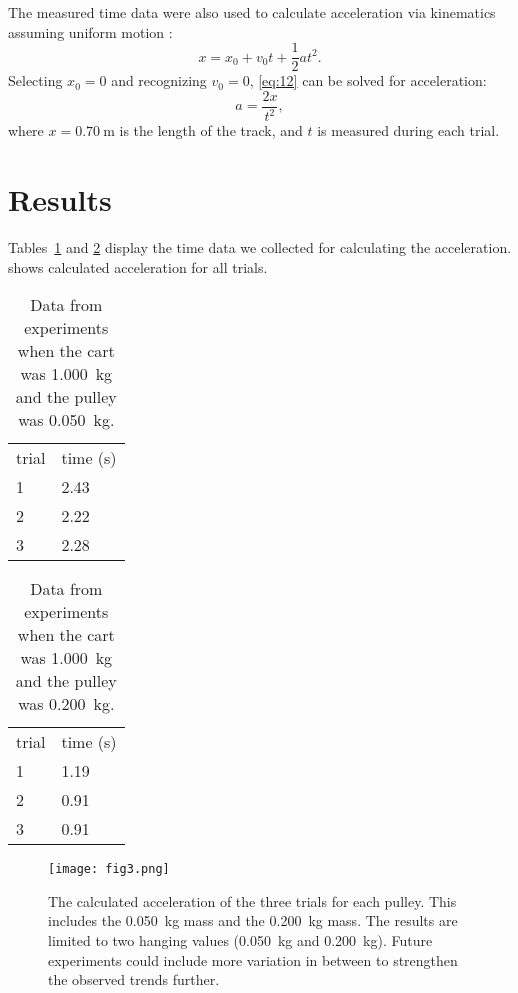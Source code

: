 ﻿\documentclass[reprint,amsmath,amssymb.aps]{revtex4-2}
\begin{document}
The measured time data were also used to calculate acceleration via kinematics assuming uniform motion \cite{tipler}:
\begin{equation}
x = x_0 + v_0 t + \dfrac{1}{2} a t^2.
\label{eq:12}
\end{equation}
Selecting $x_0=0$ and recognizing $v_0=0$, \cref{eq:12} can be solved for acceleration:
\begin{equation}
a = \dfrac{2 x}{t^2},
\label{eq:13}
\end{equation}
where $x=\qty{0.70}{\meter}$ is the length of the track, and $t$ is measured during each trial. 







\section{Results}
Tables~\ref{tab:1} and \ref{tab:2} display the time data we collected for calculating the acceleration.  shows calculated acceleration for all trials. 

\begin{table}
\caption{Data from experiments when the cart was \qty{1.000}{\kilo\gram} and the pulley was \qty{0.050}{\kilo\gram}.} 
\label{tab:1}
\begin{center}
\begin{tabular}{ll}
trial & time (\unit{\second}) \\
1 & 2.43\\
2 & 2.22\\
3 & 2.28
\end{tabular}
\end{center}
\end{table}
	
\begin{table}
\caption{Data from experiments when the cart was \qty{1.000}{\kilo\gram} and the pulley was \qty{0.200}{\kilo\gram}.}
\label{tab:2}
\begin{center}
\begin{tabular}{ll}
trial & time (\unit{\second}) \\
1 & 1.19\\
2 & 0.91\\
3 & 0.91
\end{tabular}
\end{center}
\end{table}	


\begin{figure}
\begin{center}
\texttt{[image: fig3.png]}
\end{center}
\caption{The calculated acceleration of the three trials for each pulley. This includes the \qty{0.050}{\kilo\gram} mass and the \qty{0.200}{\kilo\gram} mass. The results are limited to two hanging values (\qty{0.050}{\kilo\gram} and \qty{0.200}{\kilo\gram}). Future experiments could include more variation in between to strengthen the observed trends further.}
\label{fig:3}
\end{figure}
\end{document}
